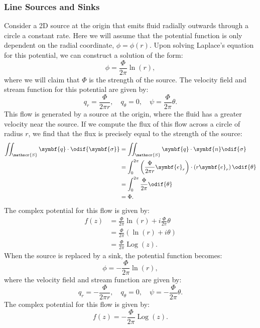 \documentclass{article}
\theoremstyle{definition}
\DeclareMathOperator{\Log}{Log}
\begin{document}
\subsubsection{Line Sources and Sinks}
Consider a 2D source at the origin that emits fluid radially outwards
through a circle a constant rate. Here we will assume that the
potential function is only dependent on the radial coordinate, \(\phi =
\phi\left( r \right)\). Upon solving Laplace's equation for this
potential, we can construct a solution of the form:
\begin{equation*}
    \phi = \frac{\Phi}{2\pi} \ln{\left( r \right)},
\end{equation*}
where we will claim that \(\Phi\) is the strength of the source. The
velocity field and stream function for this potential are given by:
\begin{equation*}
    q_r = \frac{\Phi}{2\pi r}, \quad q_{\theta} = 0, \quad \psi = \frac{\Phi}{2\pi} \theta.
\end{equation*}
This flow is generated by a source at the origin, where the fluid has a
greater velocity near the source. If we compute the flux of this flow
across a circle of radius \(r\), we find that the flux is precisely
equal to the strength of the source:
\begin{align*}
    \iint_{\mathscr{S}} \symbf{q} \cdot \odif{\symbf{\sigma}} & = \iint_{\mathscr{S}} \symbf{q} \cdot \symbf{n} \odif{\sigma}                                                     \\
                                                              & = \int_0^{2\pi} \left( \frac{\Phi}{2\pi r} \symbf{e}_{r} \right) \cdot \left( r \symbf{e}_r \right) \odif{\theta} \\
                                                              & = \int_0^{2\pi} \frac{\Phi}{2\pi} \odif{\theta}                                                                   \\
                                                              & = \Phi.
\end{align*}
The complex potential for this flow is given by:
\begin{align*}
    f\left( z \right) & = \frac{\Phi}{2\pi} \ln{\left( r \right)} + i \frac{\Phi}{2\pi} \theta \\
                      & = \frac{\Phi}{2\pi} \left( \ln{\left( r \right)} + i \theta \right)    \\
                      & = \frac{\Phi}{2\pi} \Log{\left( z \right)}.
\end{align*}
When the source is replaced by a sink, the potential function becomes:
\begin{equation*}
    \phi = -\frac{\Phi}{2\pi} \ln{\left( r \right)},
\end{equation*}
where the velocity field and stream function are given by:
\begin{equation*}
    q_r = -\frac{\Phi}{2\pi r}, \quad q_{\theta} = 0, \quad \psi = -\frac{\Phi}{2\pi} \theta.
\end{equation*}
The complex potential for this flow is given by:
\begin{equation*}
    f\left( z \right) = -\frac{\Phi}{2\pi} \Log{\left( z \right)}.
\end{equation*}
\end{document}

